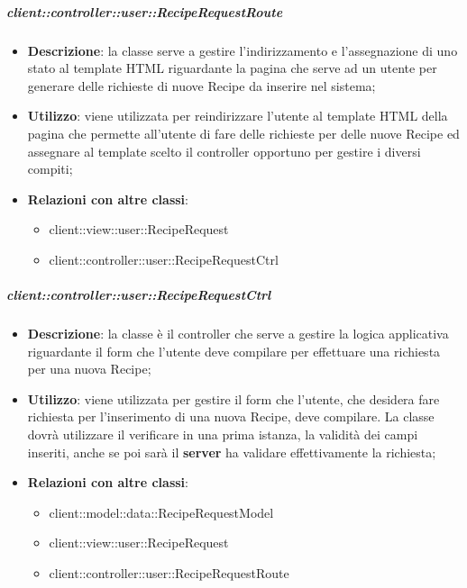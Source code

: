 		\subparagraph{client::controller::user::RecipeRequestRoute} %
		\label{subp:bdsm_app_client_controller_user_reciperequestrouteconfig}
			\begin{itemize}
				\item \textbf{Descrizione}: la classe serve a gestire l'indirizzamento e l'assegnazione di uno stato al template HTML riguardante la pagina che serve ad un utente per generare delle richieste di nuove Recipe da inserire nel sistema;
				\item \textbf{Utilizzo}: viene utilizzata per reindirizzare l'utente al template HTML della pagina che permette all'utente di fare delle richieste per delle nuove Recipe ed assegnare al template scelto il controller opportuno per gestire i diversi compiti;
				\item \textbf{Relazioni con altre classi}:
					\begin{itemize}
						\item client::view::user::RecipeRequest
						\item client::controller::user::RecipeRequestCtrl
					\end{itemize}
			\end{itemize}

		\subparagraph{client::controller::user::RecipeRequestCtrl} %
		\label{subp:client_controller_user_reciperequestctrl}
			\begin{itemize}
				\item \textbf{Descrizione}: la classe è il controller che serve a gestire la logica applicativa riguardante il form che l'utente deve compilare per effettuare una richiesta per una nuova Recipe;
				\item \textbf{Utilizzo}: viene utilizzata per gestire il form che l'utente, che desidera fare richiesta per l'inserimento di una nuova Recipe, deve compilare. La classe dovrà utilizzare il verificare in una prima istanza, la validità dei campi inseriti, anche se poi sarà il \textbf{server} ha validare effettivamente la richiesta;
				\item \textbf{Relazioni con altre classi}:
					\begin{itemize}
						\item client::model::data::RecipeRequestModel
						\item client::view::user::RecipeRequest
						\item client::controller::user::RecipeRequestRoute
					\end{itemize}
			\end{itemize}

